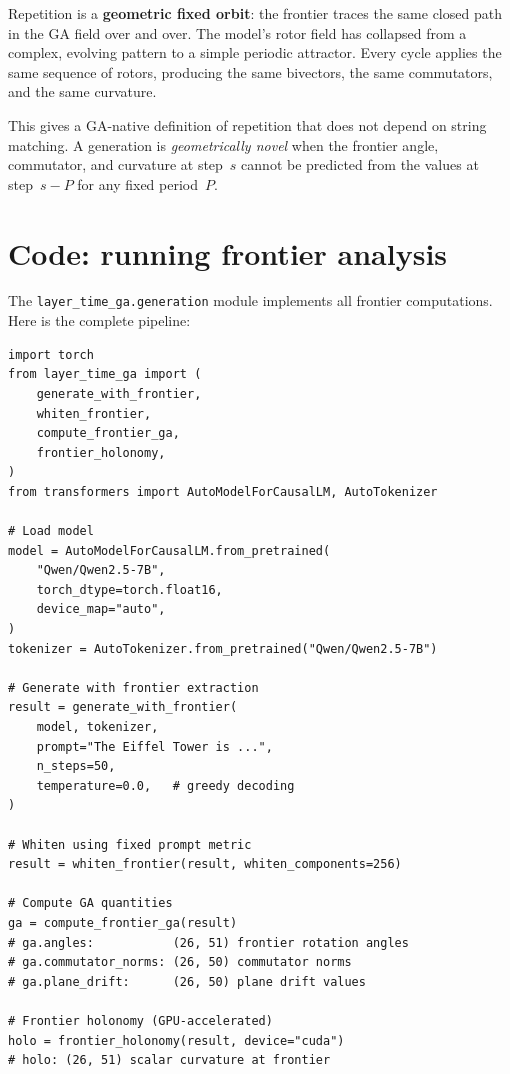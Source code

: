 \documentclass[11pt, twoside, openright]{memoir}
\numberwithin{equation}{chapter}
\begin{document}
\begin{keyidea}
Repetition is a \textbf{geometric fixed orbit}: the frontier traces
the same closed path in the GA field over and over.
The model's rotor field has collapsed from a complex, evolving
pattern to a simple periodic attractor.  Every cycle applies the
same sequence of rotors, producing the same bivectors, the same
commutators, and the same curvature.

This gives a GA-native definition of repetition that does not
depend on string matching.  A generation is \emph{geometrically
novel} when the frontier angle, commutator, and curvature at
step~$s$ cannot be predicted from the values at step~$s - P$ for
any fixed period~$P$.
\end{keyidea}


\section{Code: running frontier analysis}
\label{sec:frontier-code}

The \texttt{layer\_time\_ga.generation} module implements all
frontier computations.  Here is the complete pipeline:

\begin{lstlisting}[caption={Frontier analysis pipeline}]
import torch
from layer_time_ga import (
    generate_with_frontier,
    whiten_frontier,
    compute_frontier_ga,
    frontier_holonomy,
)
from transformers import AutoModelForCausalLM, AutoTokenizer

# Load model
model = AutoModelForCausalLM.from_pretrained(
    "Qwen/Qwen2.5-7B",
    torch_dtype=torch.float16,
    device_map="auto",
)
tokenizer = AutoTokenizer.from_pretrained("Qwen/Qwen2.5-7B")

# Generate with frontier extraction
result = generate_with_frontier(
    model, tokenizer,
    prompt="The Eiffel Tower is ...",
    n_steps=50,
    temperature=0.0,   # greedy decoding
)

# Whiten using fixed prompt metric
result = whiten_frontier(result, whiten_components=256)

# Compute GA quantities
ga = compute_frontier_ga(result)
# ga.angles:           (26, 51) frontier rotation angles
# ga.commutator_norms: (26, 50) commutator norms
# ga.plane_drift:      (26, 50) plane drift values

# Frontier holonomy (GPU-accelerated)
holo = frontier_holonomy(result, device="cuda")
# holo: (26, 51) scalar curvature at frontier
\end{lstlisting}
\end{document}
